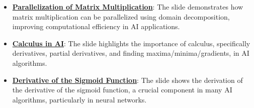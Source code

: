 \documentclass{article}%
\begin{document}
\begin{itemize}[leftmargin=*]
\item \href{https://purdue.brightspace.com/d2l/common/assets/pdfjs-d2l-dist/1.0.14-legacy/web/viewer.html?file=\%2Fcontent\%2Fenforced\%2F1095467-wl.202510.CS.24300.001\%2F04L1-Linear Algebra Primer.pdf\%3Fou\%3D1095467\&lang=en-us\&container=d2l-fileviewer-rendered-pdf\&fullscreen=d2l-fileviewer-rendered-pdf-dialog\&height=667#page=18}{\textbf{Parallelization of Matrix Multiplication}}: The slide demonstrates how matrix multiplication can be parallelized using domain decomposition, improving computational efficiency in AI applications.%
\item \href{https://purdue.brightspace.com/d2l/common/assets/pdfjs-d2l-dist/1.0.14-legacy/web/viewer.html?file=\%2Fcontent\%2Fenforced\%2F1095467-wl.202510.CS.24300.001\%2F04L1-Linear Algebra Primer.pdf\%3Fou\%3D1095467\&lang=en-us\&container=d2l-fileviewer-rendered-pdf\&fullscreen=d2l-fileviewer-rendered-pdf-dialog\&height=667#page=19}{\textbf{Calculus in AI}}: The slide highlights the importance of calculus, specifically derivatives, partial derivatives, and finding maxima/minima/gradients, in AI algorithms.%
\item \href{https://purdue.brightspace.com/d2l/common/assets/pdfjs-d2l-dist/1.0.14-legacy/web/viewer.html?file=\%2Fcontent\%2Fenforced\%2F1095467-wl.202510.CS.24300.001\%2F04L1-Linear Algebra Primer.pdf\%3Fou\%3D1095467\&lang=en-us\&container=d2l-fileviewer-rendered-pdf\&fullscreen=d2l-fileviewer-rendered-pdf-dialog\&height=667#page=21}{\textbf{Derivative of the Sigmoid Function}}: The slide shows the derivation of the derivative of the sigmoid function, a crucial component in many AI algorithms, particularly in neural networks.%
\end{itemize}%
\end{document}

